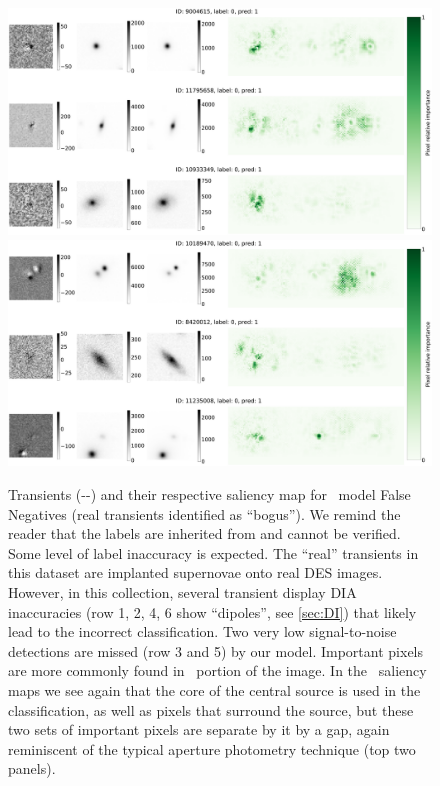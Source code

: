 \begin{figure}
    \centering
    \includegraphics[width=0.8\linewidth]{
    figures/saliency_plot_other3FN-see66.pdf}
    \includegraphics[width=0.8\linewidth]{
    figures/saliency_plot_other3FN-see2041.pdf}
    \caption{Transients (\diff-\search-\temp)  and their respective saliency map for \diabased\ model False Negatives (real transients identified as ``bogus'').
    We remind the reader that the labels are inherited from  \citet{Goldstein_2015} and cannot be verified. Some level of label inaccuracy is expected. The ``real'' transients in this dataset are implanted supernovae onto real DES images. However, in this collection, several transient display DIA inaccuracies (row 1, 2, 4, 6 show ``dipoles'', see \autoref{sec:DI}) that likely lead to the incorrect classification. Two very low signal-to-noise detections are missed (row 3 and 5) by our model.
    Important pixels are more commonly found in \diff\ portion of the image. In the \search\ saliency maps we see again that the core of the central source is used in the classification, as well as pixels that surround the source, but these two sets of important pixels are separate by it by a gap, again reminiscent of the typical aperture photometry technique (top two panels). } 
    \label{fig:saliency_dia3id_FN}
\end{figure}




